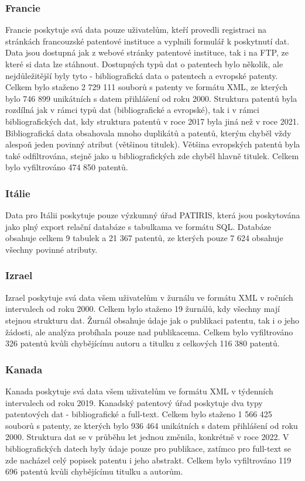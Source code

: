 \subsubsection{Francie}
Francie poskytuje svá data pouze uživatelům, kteří provedli registraci na stránkách francouzské patentové instituce a vyplnili formulář k poskytnutí dat. Data jsou dostupná jak z webové stránky patentové instituce, tak i na \gls{FTP}, ze které si data lze stáhnout. Dostupných typů dat o patentech bylo několik, ale nejdůležitější byly tyto - bibliografická data o patentech a evropské patenty.
\newline
\indent Celkem bylo staženo 2 729 111 souborů s patenty ve formátu \gls{XML}, ze kterých bylo 746 899 unikátních s datem přihlášení od roku 2000. Struktura patentů byla rozdílná jak v rámci typů dat (bibliografické a evropské), tak i v rámci bibliografických dat, kdy struktura patentů v roce 2017 byla jiná než v roce 2021. Bibliografická data obsahovala mnoho duplikátů a patentů, kterým chyběl vždy alespoň jeden povinný atribut (většinou titulek). Většina evropských patentů byla také odfiltrována, stejně jako u bibliografických zde chyběl hlavně titulek. Celkem bylo vyfiltrováno 474 850 patentů.

\subsubsection{Itálie}
Data pro Itálii poskytuje pouze výzkumný úřad PATIRIS, která jsou poskytována jako plný export relační databáze s tabulkama ve formátu \gls{SQL}. Databáze obsahuje celkem 9 tabulek a 21 367 patentů, ze kterých pouze 7 624 obsahuje všechny povinné atributy.

\subsubsection{Izrael}
Izrael poskytuje svá data všem uživatelům v žurnálu ve formátu \gls{XML} v ročních intervalech od roku 2000. Celkem bylo staženo 19 žurnálů, kdy všechny mají stejnou strukturu dat. Žurnál obsahuje údaje jak o publikaci patentu, tak i o jeho žádosti, ale analýza probíhala pouze nad publikacema. Celkem bylo vyfiltrováno 326 patentů kvůli chybějícímu autoru a titulku z celkových 116 380 patentů.

\subsubsection{Kanada}
Kanada poskytuje svá data všem uživatelům ve formátu \gls{XML} v týdenních intervalech od roku 2019. Kanadský patentový úřad poskytuje dva typy patentových dat - bibliografické a full-text.
\newline
\indent Celkem bylo staženo 1 566 425 souborů s patenty, ze kterých bylo 936 464 unikátních s datem přihlášení od roku 2000. Struktura dat se v průběhu let jednou změnila, konkrétně v roce 2022. V bibliografických datech byly údaje pouze pro publikace, zatímco pro full-text se zde nacházel celý popisek patentu i jeho abstrakt. Celkem bylo vyfiltrováno 119 696 patentů kvůli chybějícímu titulku a autorům.

